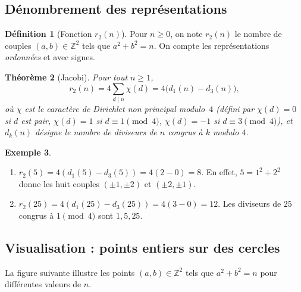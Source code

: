 \documentclass[12pt,a4paper,openany]{book}
\theoremstyle{definition}
\newtheorem{definition}{Définition}[chapter]
\newtheorem{exemple}[definition]{Exemple}
\theoremstyle{plain}
\newtheorem{theoreme}[definition]{Théorème}
\theoremstyle{remark}
\newcommand{\Z}{\mathbb{Z}}
\begin{document}
\subsection{Dénombrement des représentations}

\begin{definition}[Fonction $r_2(n)$]
\label{def:r2}
Pour $n \geq 0$, on note $r_2(n)$ le nombre de couples $(a,b) \in \Z^2$ tels que
$a^2 + b^2 = n$. On compte les représentations \emph{ordonnées} et avec signes.
\end{definition}

\begin{theoreme}[Jacobi]
\label{thm:jacobi-r2}
Pour tout $n \geq 1$,
\[
  r_2(n) = 4\sum_{d \mid n} \chi(d)
    = 4\bigl(d_1(n) - d_3(n)\bigr),
\]
où $\chi$ est le caractère de Dirichlet non principal modulo~$4$ (défini par $\chi(d) = 0$
si $d$ est pair, $\chi(d) = 1$ si $d \equiv 1 \pmod{4}$, $\chi(d) = -1$ si
$d \equiv 3 \pmod{4}$), et $d_k(n)$ désigne le nombre de diviseurs de $n$ congrus à $k$
modulo $4$.
\end{theoreme}

\begin{exemple}
\label{ex:r2-calculs}
\begin{enumerate}[label=(\alph*)]
  \item $r_2(5) = 4(d_1(5) - d_3(5)) = 4(2 - 0) = 8$. En effet, $5 = 1^2 + 2^2$ donne
    les huit couples $(\pm 1, \pm 2)$ et $(\pm 2, \pm 1)$.
  \item $r_2(25) = 4(d_1(25) - d_3(25)) = 4(3 - 0) = 12$. Les diviseurs de $25$ congrus
    à $1 \pmod{4}$ sont $1, 5, 25$.
\end{enumerate}
\end{exemple}

\subsection{Visualisation : points entiers sur des cercles}

La figure suivante illustre les points $(a,b) \in \Z^2$ tels que $a^2 + b^2 = n$ pour
différentes valeurs de $n$.
\end{document}
